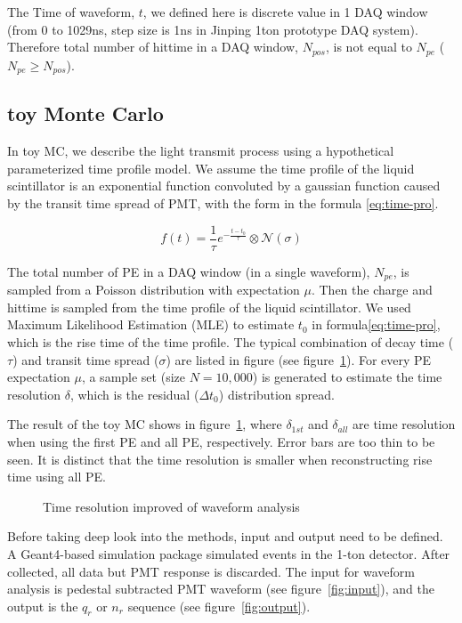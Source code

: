 The Time of waveform, $t$, we defined here is discrete value in 1 DAQ window (from 0 to 1029ns, step size is 1ns in Jinping 1ton prototype DAQ system). Therefore total number of hittime in a DAQ window, $N_{pos}$, is not equal to $N_{pe}$ ($N_{pe} \geq N_{pos}$). 

\subsection{toy Monte Carlo}

In toy MC, we describe the light transmit process using a hypothetical parameterized time profile model. We assume the time profile of the liquid scintillator is an exponential function convoluted by a gaussian function\cite{li_separation_2016} caused by the transit time spread of PMT, with the form in the formula \eqref{eq:time-pro}. 

\begin{equation}
    f(t) = \frac{1}{\tau}e^{-\frac{t - t_{0}}{\tau}} \otimes \mathcal{N}(\sigma)
    \label{eq:time-pro}
\end{equation}

The total number of PE in a DAQ window (in a single waveform), $N_{pe}$, is sampled from a Poisson distribution with expectation $\mu$. Then the charge and hittime is sampled from the time profile of the liquid scintillator. We used Maximum Likelihood Estimation (MLE) to estimate $t_{0}$ in formula\eqref{eq:time-pro}, which is the rise time of the time profile. The typical combination of decay time ($\tau$) and transit time spread ($\sigma$) are listed in figure (see figure~\ref{fig:reso-diff}). For every PE expectation $\mu$, a sample set (size $N=10,000$) is generated to estimate the time resolution $\delta$, which is the residual ($\Delta t_{0}$) distribution spread. 

The result of the toy MC shows in figure~\ref{fig:reso-diff}, where $\delta_{1st}$ and $\delta_{all}$ are time resolution when using the first PE and all PE, respectively. Error bars are too thin to be seen. It is distinct that the time resolution is smaller when reconstructing rise time using all PE. 

\begin{figure}[H]
    \centering
    \scalebox{0.7}{}
    \caption{\label{fig:reso-diff} Time resolution improved of waveform analysis}
\end{figure}

Before taking deep look into the methods, input and output need to be defined. A Geant4\cite{agostinelli_geant4simulation_2003}-based simulation package simulated events in the 1-ton detector\cite{wang_design_2017}. After collected, all data but PMT response is discarded. The input for waveform analysis is pedestal subtracted PMT waveform (see figure~\ref{fig:input}), and the output is the $q_{r}$ or $n_{r}$ sequence (see figure~\ref{fig:output}). 

